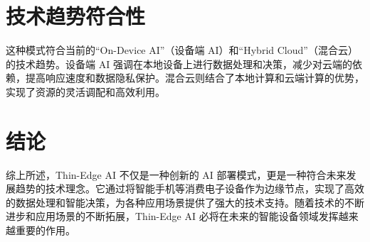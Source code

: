 \documentclass{article}
\begin{document}
\begin{CJK*}{UTF8}{gkai}
\section{技术趋势符合性}
这种模式符合当前的“On-Device AI”（设备端 AI）和“Hybrid Cloud”（混合云）的技术趋势。设备端 AI 强调在本地设备上进行数据处理和决策，减少对云端的依赖，提高响应速度和数据隐私保护。混合云则结合了本地计算和云端计算的优势，实现了资源的灵活调配和高效利用。

\section{结论}
综上所述，Thin-Edge AI 不仅是一种创新的 AI 部署模式，更是一种符合未来发展趋势的技术理念。它通过将智能手机等消费电子设备作为边缘节点，实现了高效的数据处理和智能决策，为各种应用场景提供了强大的技术支持。随着技术的不断进步和应用场景的不断拓展，Thin-Edge AI 必将在未来的智能设备领域发挥越来越重要的作用。

\printbibliography
\end{CJK*} %
\end{document}
